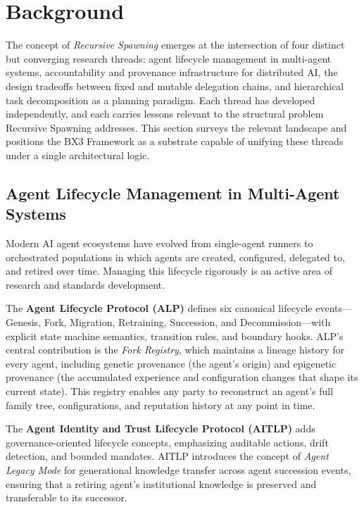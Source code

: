 \section{Background}

The concept of \textit{Recursive Spawning} emerges at the intersection of four distinct but converging research threads: agent lifecycle management in multi-agent systems, accountability and provenance infrastructure for distributed AI, the design tradeoffs between fixed and mutable delegation chains, and hierarchical task decomposition as a planning paradigm. Each thread has developed independently, and each carries lessons relevant to the structural problem Recursive Spawning addresses. This section surveys the relevant landscape and positions the BX3 Framework as a substrate capable of unifying these threads under a single architectural logic.

\subsection{Agent Lifecycle Management in Multi-Agent Systems}

Modern AI agent ecosystems have evolved from single-agent runners to orchestrated populations in which agents are created, configured, delegated to, and retired over time. Managing this lifecycle rigorously is an active area of research and standards development.

The \textbf{Agent Lifecycle Protocol (ALP)} \cite{moore2025hmas} defines six canonical lifecycle events---Genesis, Fork, Migration, Retraining, Succession, and Decommission---with explicit state machine semantics, transition rules, and boundary hooks. ALP's central contribution is the \textit{Fork Registry}, which maintains a lineage history for every agent, including genetic provenance (the agent's origin) and epigenetic provenance (the accumulated experience and configuration changes that shape its current state). This registry enables any party to reconstruct an agent's full family tree, configurations, and reputation history at any point in time.

The \textbf{Agent Identity and Trust Lifecycle Protocol (AITLP)} \cite{trusttrack2025} adds governance-oriented lifecycle concepts, emphasizing auditable actions, drift detection, and bounded mandates. AITLP introduces the concept of \textit{Agent Legacy Mode} for generational knowledge transfer across agent succession events, ensuring that a retiring agent's institutional knowledge is preserved and transferable to its successor.

